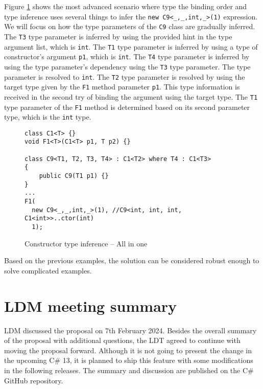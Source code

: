 \par
Figure \ref{img79:example7} shows the most advanced scenario where type the binding order and type inference uses several things to infer the \texttt{new C9<\_,\_,int,\_>(1)} expression. 
We will focus on how the type parameters of the \texttt{C9} class are gradually inferred. 
The \texttt{T3} type parameter is inferred by using the provided hint in the type argument list, which is \texttt{int}. 
The \texttt{T1} type parameter is inferred by using a type of constructor’s argument \texttt{p1}, which is \texttt{int}.
The \texttt{T4} type parameter is inferred by using the type parameter’s dependency using the \texttt{T3} type parameter. 
The type parameter is resolved to \texttt{int}. 
The \texttt{T2} type parameter is resolved by using the target type given by the \texttt{F1} method parameter \texttt{p1}. 
This type information is received in the second try of binding the argument using the target type. 
The \texttt{T1} type parameter of the \texttt{F1} method is determined based on its second parameter type, which is the \texttt{int} type.
\begin{figure}[h]
\begin{lstlisting}[style=csharp, showstringspaces=false]
class C1<T> {}
void F1<T>(C1<T> p1, T p2) {}

class C9<T1, T2, T3, T4> : C1<T2> where T4 : C1<T3>
{
    public C9(T1 p1) {}
}
...
F1(
  new C9<_,_,int,_>(1), //C9<int, int, int, C1<int>>..ctor(int)
  1);
\end{lstlisting}
\caption{Constructor type inference -- All in one}
\label{img79:example7}
\end{figure}
\par
Based on the previous examples, the solution can be considered robust enough to solve complicated examples.

\section{LDM meeting summary}

\ac{LDM} discussed the proposal on 7th February 2024. 
Besides the overall summary of the proposal with additional questions, the \ac{LDT} agreed to continue with moving the proposal forward. 
Although it is not going to present the change in the upcoming C\# 13, it is planned to ship this feature with some modifications in the following releases. 
The summary \cite{online:mettingSummary} and discussion \cite{online:mettingSummaryDisc} are published on the C\# GitHub repository.